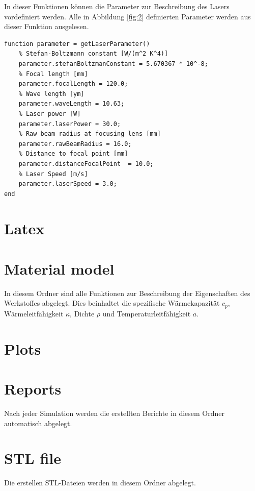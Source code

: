 \documentclass{scrartcl}
\begin{document}
In dieser Funktionen können die Parameter zur Beschreibung des Lasers vordefiniert werden. Alle in Abbildung \ref{fig:2} definierten Parameter werden aus dieser Funktion ausgelesen. 

\begin{lstlisting}
function parameter = getLaserParameter()
    % Stefan-Boltzmann constant [W/(m^2 K^4)]
    parameter.stefanBoltzmanConstant = 5.670367 * 10^-8;
    % Focal length [mm]
    parameter.focalLength = 120.0;
    % Wave length [ym]
    parameter.waveLength = 10.63;
    % Laser power [W]
    parameter.laserPower = 30.0;
    % Raw beam radius at focusing lens [mm]
    parameter.rawBeamRadius = 16.0;
    % Distance to focal point [mm]
    parameter.distanceFocalPoint  = 10.0;
    % Laser Speed [m/s]
    parameter.laserSpeed = 3.0;
end
\end{lstlisting}

\section{Latex}\label{sec:latex}

\section{Material model}\label{sec:materialModel}

In diesem Ordner sind alle Funktionen zur Beschreibung der Eigenschaften des Werkstoffes abgelegt. Dies beinhaltet die spezifische Wärmekapazität $ c_{p} $, Wärmeleitfähigkeit $ \kappa $, Dichte $ \rho $ und Temperaturleitfähigkeit $ a $.

\section{Plots}\label{sec:plots}

\section{Reports}\label{sec:reports}

Nach jeder Simulation werden die erstellten Berichte in diesem Ordner automatisch abgelegt.

\section{STL file}\label{sec:stlFile}

Die erstellen STL-Dateien werden in diesem Ordner abgelegt.
\end{document}
